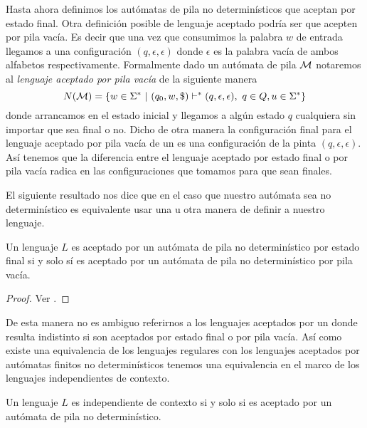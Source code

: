 \documentclass[tesis.tex]{subfiles}
\begin{document}
Hasta ahora definimos los autómatas de pila no determinísticos que aceptan por estado final. Otra definición posible de lenguaje aceptado podría ser que acepten por pila vacía. 
Es decir que una vez que consumimos la palabra $w$ de entrada llegamos a una configuración $(q, \epsilon, \epsilon)$ donde $\epsilon$ es la palabra vacía de ambos alfabetos respectivamente. Formalmente dado un autómata de pila $\cal M$  notaremos al \emph{lenguaje aceptado por pila vacía} de la siguiente manera
\begin{equation*}
	N({\cal M}) = \{ w \in \Sigma^* \ | \ (q_0,w,\$) \vdash^* (q, \epsilon, \epsilon), \ q \in Q, u \in \Sigma^*    \}
\end{equation*}
donde arrancamos en el estado inicial y llegamos a algún estado $q$ cualquiera sin importar que sea final o no.
Dicho de otra manera la configuración final para el lenguaje aceptado por pila vacía de un \APND es una configuración de la pinta $(q, \epsilon, \epsilon)$.
Así tenemos que la diferencia entre el lenguaje aceptado por estado final o por pila vacía radica en las configuraciones que tomamos para que sean finales. 


El siguiente resultado nos dice que en el caso que nuestro autómata sea no determinístico es equivalente usar una u otra manera de definir a nuestro lenguaje.

\medskip
\begin{teo}
	Un lenguaje $L$ es aceptado por un autómata de pila no determinístico por estado final si y solo sí es aceptado por un autómata de pila no determinístico por pila vacía.
\end{teo}

\begin{proof}
	Ver \cite[237-238, 240-241]{hopcraft-ullman}.
\end{proof}

De esta manera no es ambiguo referirnos a los lenguajes aceptados por un \APND donde resulta indistinto si son aceptados por estado final o por pila vacía.
Así como existe una equivalencia de los lenguajes regulares con los lenguajes aceptados por autómatas finitos no determinísticos tenemos una equivalencia en el marco de los lenguajes independientes de contexto.

\medskip

\begin{teo}\label{teo_ic_apnd}
	Un lenguaje $L$ es independiente de contexto si y solo si es aceptado por un autómata de pila no determinístico.
\end{teo}
\end{document}
